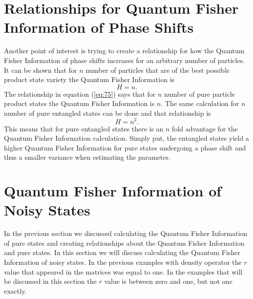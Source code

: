 \documentclass[twocolumn]{article}
\begin{document}
\section*{Relationships for Quantum Fisher Information of Phase Shifts}
Another point of interest is trying to create a relationship for how the Quantum Fisher Information of phase shifts increases for an arbitrary number of particles. It can be shown that for $n$ number of particles that are of the best possible product state variety the Quantum Fisher Information is
\begin{equation} \label{eq:75}
H=n.
\end{equation}
The relationship in equation (\ref{eq:75}) says that for $n$ number of pure particle product states the Quantum Fisher Information is $n$. The same calculation for $n$ number of pure entangled states can be done and that relationship is
\begin{equation} \label{eq:76}
H=n^2.
\end{equation}
This means that for pure entangled states there is an $n$ fold advantage for the Quantum Fisher Information calculation. Simply put, the entangled states yield a higher Quantum Fisher Information for pure states undergoing a phase shift and thus a smaller variance when estimating the parameter.
\section*{Quantum Fisher Information of Noisy States}
In the previous section we discussed calculating the Quantum Fisher Information of pure states and creating relationships about the Quantum Fisher Information and pure states. In this section we will discuss calculating the Quantum Fisher Information of noisy states. In the previous examples with density operator the $r$ value that appeared in the matrices was equal to one. In the examples that will be discussed in this section the $r$ value is between zero and one, but not one exactly.
\end{document}
